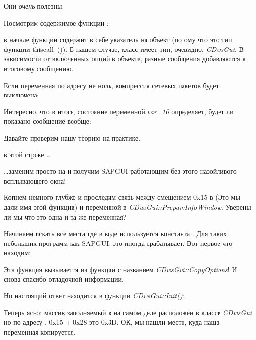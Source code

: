 Они \emph{очень} полезны.

Посмотрим содержимое функции :



\ECX в начале функции содержит в себе указатель на объект (потому что это тип функции thiscall~()).
В нашем случае, класс имеет тип, очевидно, \emph{CDwsGui}. 
В зависимости от включенных опций в объекте, 
разные сообщения добавляются к итоговому сообщению.

Если переменная по адресу  не ноль, компрессия сетевых пакетов будет выключена:



Интересно, что в итоге, состояние переменной \emph{var\_10} определяет, будет ли показано сообщение вообще:



Давайте проверим нашу теорию на практике.

\JNZ в этой строке \dots



\dots заменим просто на \JMP и получим SAPGUI работающим без этого назойливого всплывающего окна!

Копнем немного глубже и проследим связь между смещением 0x15 в 
(Это мы дали имя этой функции) и переменной  в \emph{CDwsGui::PrepareInfoWindow}. 
Уверены ли мы что это одна и та же переменная?

Начинаем искать все места где в коде используется константа .
Для таких небольших программ как SAPGUI, это иногда срабатывает. Вот первое что находим:



Эта функция вызывается из функции с названием \emph{CDwsGui::CopyOptions}! И снова спасибо отладочной информации.

Но настоящий ответ находится в функции \emph{CDwsGui::Init()}:



Теперь ясно: массив заполняемый в  на самом деле расположен в классе \emph{CDwsGui} но по адресу
. 0x15 + 0x28 это 0x3D. ОК, мы нашли место, куда наша переменная копируется.

